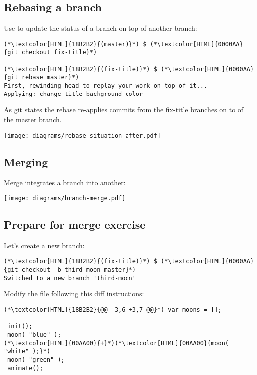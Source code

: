 \subsection{Rebasing a branch}
\begin{frame}[fragile]
  \subslidetitle

  Use  to update the status of a branch on top of another branch:

  \begin{lstlisting}
(*\textcolor[HTML]{18B2B2}{(master)}*) $ (*\textcolor[HTML]{0000AA}{git checkout fix-title}*)

(*\textcolor[HTML]{18B2B2}{(fix-title)}*) $ (*\textcolor[HTML]{0000AA}{git rebase master}*)
First, rewinding head to replay your work on top of it...
Applying: change title background color
\end{lstlisting}

  As git states the rebase re-applies commits from the fix-title branches on to of the master branch.

  \vspace{1em}
  \centerline{\texttt{[image: diagrams/rebase-situation-after.pdf]}}

\end{frame}

\subsection{Merging}
\begin{frame}[fragile]
  \subslidetitle
  Merge integrates a branch into another:
  \centerline{\texttt{[image: diagrams/branch-merge.pdf]}}
\end{frame}

\subsection{Prepare for merge exercise}
\begin{frame}[fragile]
  \subslidetitle

  Let's create a new  branch:
  \begin{lstlisting}
(*\textcolor[HTML]{18B2B2}{(fix-title)}*) $ (*\textcolor[HTML]{0000AA}{git checkout -b third-moon master}*)
Switched to a new branch 'third-moon'
\end{lstlisting}

  Modify the  file following this diff instructions:
  \begin{lstlisting}
(*\textcolor[HTML]{18B2B2}{@@ -3,6 +3,7 @@}*) var moons = [];

 init();
 moon( "blue" );
(*\textcolor[HTML]{00AA00}{+}*)(*\textcolor[HTML]{00AA00}{moon( "white" );}*)
 moon( "green" );
 animate();
\end{lstlisting}
\end{frame}

